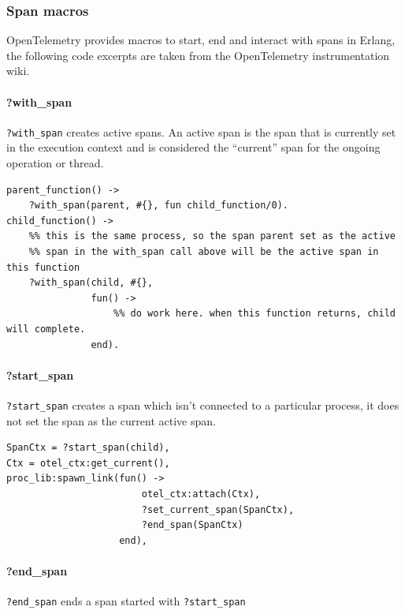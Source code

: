     \subsubsection{Span macros}
        OpenTelemetry provides macros to start, end and interact with spans in Erlang, the following code excerpts are taken from the OpenTelemetry instrumentation wiki. \cite{otel-in}
        \paragraph{?with\_span}
            \texttt{?with\_span} creates active spans. An active span is the span that is currently set in the execution context and is considered the ``current'' span for the ongoing operation or thread. \cite{active-s}
        \begin{verbatim}
parent_function() ->
    ?with_span(parent, #{}, fun child_function/0).
child_function() ->
    %% this is the same process, so the span parent set as the active
    %% span in the with_span call above will be the active span in this function
    ?with_span(child, #{},
               fun() ->
                   %% do work here. when this function returns, child will complete.
               end).
        \end{verbatim}
        \paragraph{?start\_span}
            \texttt{?start\_span} creates a span which isn't connected to a particular process, it does not set the span as the current active span.
        \begin{verbatim}
SpanCtx = ?start_span(child),
Ctx = otel_ctx:get_current(),
proc_lib:spawn_link(fun() ->
                        otel_ctx:attach(Ctx),
                        ?set_current_span(SpanCtx),
                        ?end_span(SpanCtx)
                    end),
        \end{verbatim}
        \paragraph{?end\_span}
            \texttt{?end\_span} ends a span started with \texttt{?start\_span}

